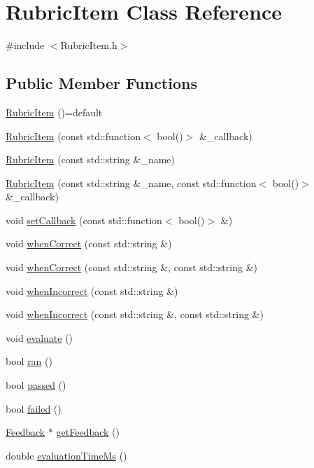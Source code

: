\hypertarget{class_rubric_item}{}\section{Rubric\+Item Class Reference}
\label{class_rubric_item}


{\ttfamily \#include $<$Rubric\+Item.\+h$>$}

\subsection*{Public Member Functions}
\begin{DoxyCompactItemize}
\item 
\hyperlink{class_rubric_item_a0fac66f38c2f2a1712690c3728b1a63d}{Rubric\+Item} ()=default
\item 
\hyperlink{class_rubric_item_a9ab3ef65052c84f8fb59764429e67980}{Rubric\+Item} (const std\+::function$<$ bool()$>$ \&\+\_\+callback)
\item 
\hyperlink{class_rubric_item_a983d89dd363b56df35c0685c083e7172}{Rubric\+Item} (const std\+::string \&\+\_\+name)
\item 
\hyperlink{class_rubric_item_ae2ff2692b1eb2250e76d3da3fe6fbe79}{Rubric\+Item} (const std\+::string \&\+\_\+name, const std\+::function$<$ bool()$>$ \&\+\_\+callback)
\item 
void \hyperlink{class_rubric_item_a29bf17ee6e15089b388cca8af88dfc4e}{set\+Callback} (const std\+::function$<$ bool()$>$ \&)
\item 
void \hyperlink{class_rubric_item_a7ab095215698e315f800bea2052f25ed}{when\+Correct} (const std\+::string \&)
\item 
void \hyperlink{class_rubric_item_a7b47b9d25ac196628033f95fda43a374}{when\+Correct} (const std\+::string \&, const std\+::string \&)
\item 
void \hyperlink{class_rubric_item_a236b6f498b326303d0f3ae6613e82638}{when\+Incorrect} (const std\+::string \&)
\item 
void \hyperlink{class_rubric_item_aa62614e36ef2cb7bc60fdd03183ff46e}{when\+Incorrect} (const std\+::string \&, const std\+::string \&)
\item 
void \hyperlink{class_rubric_item_a83b1d15314c14b6e67207f086d7fa6a5}{evaluate} ()
\item 
bool \hyperlink{class_rubric_item_a96a9432a63552a832a9a8b3b422402e1}{ran} ()
\item 
bool \hyperlink{class_rubric_item_a0b3f8d8fd8cf27e9684510da51a58d6e}{passed} ()
\item 
bool \hyperlink{class_rubric_item_af5675f379ed58476fada3ce92ee698f0}{failed} ()
\item 
\hyperlink{class_feedback}{Feedback} $\ast$ \hyperlink{class_rubric_item_a35478d834a71b71f3726ac6e9108b97d}{get\+Feedback} ()
\item 
double \hyperlink{class_rubric_item_a34a18531cc098667fb47e440b876dc18}{evaluation\+Time\+Ms} ()
\end{DoxyCompactItemize}

